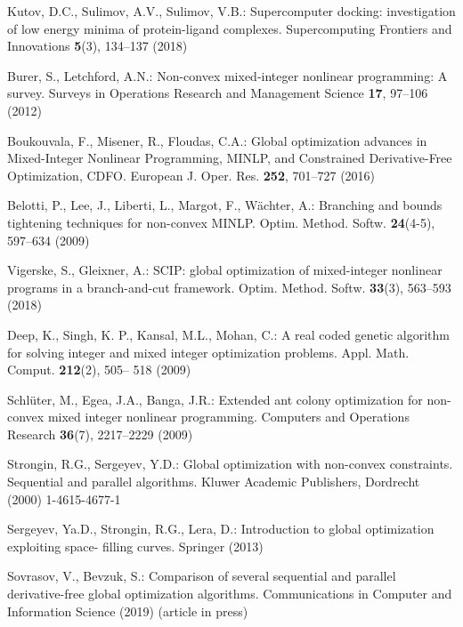 \documentclass[runningheads]{llncs}
\begin{document}
\begin{thebibliography}{10}

Kutov, D.C., Sulimov, A.V., Sulimov, V.B.: Supercomputer docking: investigation of low energy minima of protein-ligand complexes. Supercomputing Frontiers and Innovations \textbf{5}(3), 134--137 (2018)

Burer, S., Letchford, A.N.: Non-convex mixed-integer nonlinear programming: A survey.
Surveys in Operations Research and Management Science \textbf{17}, 97--106 (2012)

Boukouvala, F., Misener, R., Floudas, C.A.: Global optimization advances in Mixed-Integer
Nonlinear Programming, MINLP, and Constrained Derivative-Free Optimization, CDFO.
European J. Oper. Res. \textbf{252}, 701--727 (2016)

Belotti, P., Lee, J., Liberti, L., Margot, F., W\"achter, A.: Branching and bounds tightening
techniques for non-convex MINLP. Optim. Method. Softw. \textbf{24}(4-5), 597--634 (2009)

Vigerske, S., Gleixner, A.: SCIP: global optimization of mixed-integer nonlinear programs in a
branch-and-cut framework.
Optim. Method. Softw. \textbf{33}(3), 563--593 (2018)

Deep, K., Singh, K. P., Kansal, M.L., Mohan, C.: A real coded genetic algorithm for solving
integer and mixed integer optimization problems. Appl. Math. Comput. \textbf{212}(2), 505--
518 (2009)

Schl\"uter, M., Egea, J.A., Banga, J.R.: Extended ant colony optimization for non-convex
mixed integer nonlinear programming. Computers and Operations Research \textbf{36}(7),
2217--2229 (2009)

Strongin, R.G., Sergeyev, Y.D.: Global optimization with non-convex constraints. Sequential
and parallel algorithms. Kluwer Academic Publishers, Dordrecht (2000) %
1-4615-4677-1

Sergeyev, Ya.D., Strongin, R.G., Lera, D.: Introduction to global optimization exploiting space-
filling curves. Springer (2013) %

Sovrasov, V., Bevzuk, S.: Comparison of several sequential and parallel derivative-free global optimization algorithms. 	Communications in Computer and Information Science (2019) (article in press)


\end{thebibliography}
\end{document}
